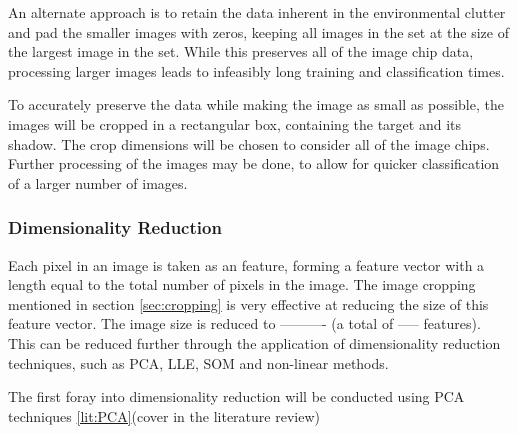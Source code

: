 An alternate approach is to retain the data inherent in the environmental clutter and pad the smaller images with zeros, keeping all images in the set at the size of the largest image in the set. While this preserves all of the image chip data, processing larger images leads to infeasibly long training and classification times.

To accurately preserve the data while making the image as small as possible, the images will be cropped in a rectangular box, containing the target and its shadow. The crop dimensions will be chosen to consider all of the image chips. Further processing of the images may be done, to allow for quicker classification of a larger number of images.

\subsubsection{Dimensionality Reduction}
Each pixel in an image is taken as an feature, forming a feature vector with a length equal to the total number of pixels in the image. The image cropping mentioned in section \ref{sec:cropping} is very effective at reducing the size of this feature vector. The image size is reduced to ---------- (a total of ----- features). This can be reduced further through the application of dimensionality reduction techniques, such as PCA, LLE, SOM and non-linear methods. 

The first foray into dimensionality reduction will be conducted using PCA techniques \ref{lit:PCA}(cover in the literature review)

